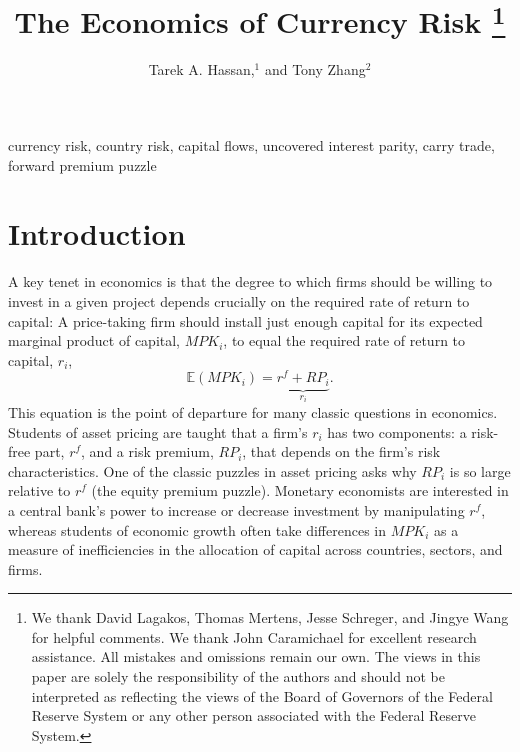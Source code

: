 \documentclass{ar-1col}
\begin{document}

\author{Tarek A. Hassan,$^1$ and Tony Zhang$^2$  }



    \title{The Economics of Currency Risk \thanks{We thank David Lagakos, Thomas Mertens, Jesse Schreger, and Jingye Wang for helpful comments. We thank John Caramichael for excellent research assistance. All mistakes and omissions remain our own. The views in this paper are solely the responsibility of the authors and should not be interpreted as reflecting the views of the Board of Governors of the Federal Reserve System or any other person associated with the Federal Reserve System.}}




\begin{keywords}
  currency risk, country risk, capital flows, uncovered interest parity, carry trade, forward premium puzzle
\end{keywords}
\maketitle

\section{Introduction}


A key tenet in economics is that the degree to which firms should be willing to invest in a given project depends crucially on the required rate of return to capital: A price-taking firm should install just enough capital for its expected marginal product of capital, $MPK_i$, to equal the required rate of return to capital, $r_i$,
\begin{equation}
  \mathbb{E}\left(MPK_i\right)=\underbrace{r^f+RP_i}_{r_i}.
  \label{eq_one}
\end{equation} 
This equation is the point of departure for many classic questions in economics. Students of asset pricing are taught that a firm's $r_i$ has two components: a risk-free part, $r^f$, and a risk premium, $RP_i$, that depends on the firm's risk characteristics. One of the classic puzzles in asset pricing asks why $RP_i$ is so large relative to $r^f$ (the equity premium puzzle). Monetary economists are interested in a central bank's power to increase or decrease investment by manipulating $r^f$, whereas students of economic growth often take differences in $MPK_i$ as a measure of inefficiencies in the allocation of capital across countries, sectors, and firms.
\end{document}
